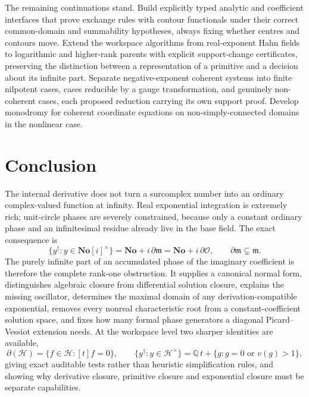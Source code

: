 \documentclass[11pt,letterpaper]{article}
\numberwithin{equation}{section}
\theoremstyle{definition}
\theoremstyle{remark}
\newcommand{\No}{\mathbf{No}}
\newcommand{\Q}{\mathbb Q}
\newcommand{\der}{\partial}
\newcommand{\Ofin}{\mathcal O}
\newcommand{\mm}{\mathfrak m}
\newcommand{\Hring}{\mathscr H}
\begin{document}
The remaining continuations stand.
Build explicitly typed analytic and coefficient interfaces that prove exchange
rules with contour functionals under their correct common-domain and
summability hypotheses, always fixing whether centres and contours move.
Extend the workspace algorithms from real-exponent Hahn fields to logarithmic
and higher-rank parents with explicit support-change certificates, preserving
the distinction between a representation of a primitive and a decision about
its infinite part. Separate negative-exponent coherent systems into finite
nilpotent cases, cases reducible by a gauge transformation, and genuinely
non-coherent cases, each proposed reduction carrying its own support proof.
Develop monodromy for coherent coordinate equations on non-simply-connected
domains in the nonlinear case.

\section{Conclusion}
\label{diff:sec:conclusion}

The internal derivative does not turn a surcomplex number into an ordinary
complex-valued function at infinity. Real exponential integration is
extremely rich; unit-circle phases are severely constrained, because only a
constant ordinary phase and an infinitesimal residue already live in the base
field. The exact consequence is
\[
 \boxed{\quad
 \{y^{\dagger}:y\in\No[i]^{\times}\}=\No+i\,\der\mm
 =\No+i\,\der\Ofin,
 \qquad \der\mm\subsetneq\mm .\quad}
\]
The purely infinite part of an accumulated phase of the imaginary coefficient
is therefore the complete rank-one obstruction. It supplies a canonical normal
form, distinguishes algebraic closure from differential solution closure,
explains the missing oscillator, determines the maximal domain of any
derivation-compatible exponential, removes every nonreal characteristic root
from a constant-coefficient solution space, and fixes how many formal phase
generators a diagonal Picard--Vessiot extension needs. At the workspace level
two sharper identities are available,
\[
 \der(\Hring)=\{f\in\Hring:[t]f=0\},
 \qquad
 \{y^{\dagger}:y\in\Hring^{\times}\}
 =\Q\,t+\{g:g=0\text{ or }v(g)>1\},
\]
giving exact auditable tests rather than heuristic simplification rules, and
showing why derivative closure, primitive closure and exponential closure must
be separate capabilities.
\end{document}
